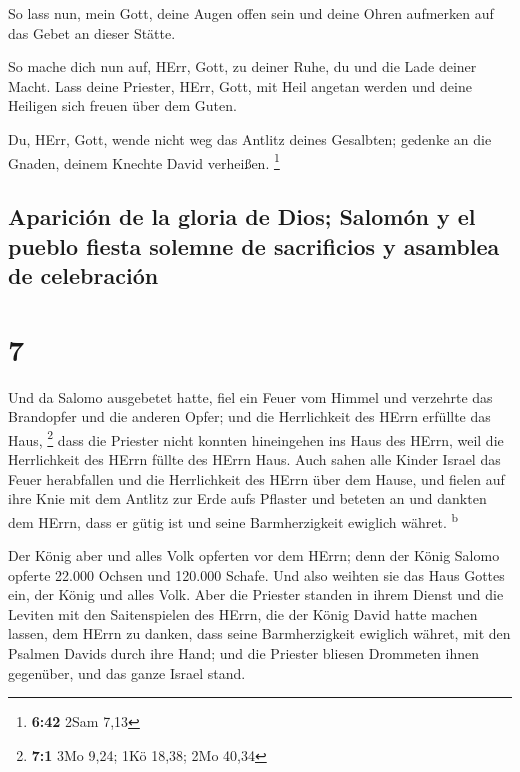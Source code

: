  So lass nun, mein Gott, deine Augen offen sein und deine
Ohren aufmerken auf das Gebet an dieser Stätte.

 So mache dich nun auf, HErr, Gott, zu deiner Ruhe, du
und die Lade deiner Macht. Lass deine Priester, HErr, Gott, mit Heil
angetan werden und deine Heiligen sich freuen über dem Guten.

 Du, HErr, Gott, wende nicht weg das Antlitz deines
Gesalbten; gedenke an die Gnaden, deinem Knechte David verheißen.
\footnote{\textbf{6:42} 2Sam 7,13}

\hypertarget{apariciuxf3n-de-la-gloria-de-dios-salomuxf3n-y-el-pueblo-fiesta-solemne-de-sacrificios-y-asamblea-de-celebraciuxf3n}{%
\subsection{Aparición de la gloria de Dios; Salomón y el pueblo fiesta
solemne de sacrificios y asamblea de
celebración}\label{apariciuxf3n-de-la-gloria-de-dios-salomuxf3n-y-el-pueblo-fiesta-solemne-de-sacrificios-y-asamblea-de-celebraciuxf3n}}

\hypertarget{section-6}{%
\section{7}\label{section-6}}

 Und da Salomo ausgebetet hatte, fiel ein Feuer vom Himmel
und verzehrte das Brandopfer und die anderen Opfer; und die Herrlichkeit
des HErrn erfüllte das Haus, \footnote{\textbf{7:1} 3Mo 9,24; 1Kö 18,38;
  2Mo 40,34}  dass die Priester nicht konnten hineingehen
ins Haus des HErrn, weil die Herrlichkeit des HErrn füllte des HErrn
Haus.  Auch sahen alle Kinder Israel das Feuer herabfallen
und die Herrlichkeit des HErrn über dem Hause, und fielen auf ihre Knie
mit dem Antlitz zur Erde aufs Pflaster und beteten an und dankten dem
HErrn, dass er gütig ist und seine Barmherzigkeit ewiglich währet.
\textsuperscript{b}

 Der König aber und alles Volk opferten vor dem HErrn;
 denn der König Salomo opferte 22.000 Ochsen und 120.000
Schafe. Und also weihten sie das Haus Gottes ein, der König und alles
Volk.  Aber die Priester standen in ihrem Dienst und die
Leviten mit den Saitenspielen des HErrn, die der König David hatte
machen lassen, dem HErrn zu danken, dass seine Barmherzigkeit ewiglich
währet, mit den Psalmen Davids durch ihre Hand; und die Priester bliesen
Drommeten ihnen gegenüber, und das ganze Israel stand.

